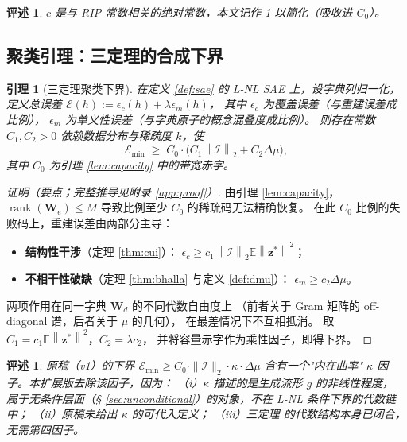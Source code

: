 \documentclass[11pt,a4paper]{article}
\newtheorem{lemma}[theorem]{引理}
\newtheorem{remark}[theorem]{评述}
\theoremstyle{remark}
\DeclareMathOperator{\rank}{rank}
\newcommand{\Z}{\bm{z}}
\newcommand{\W}{\bm{W}}
\newcommand{\I}{\mathcal{I}}
\newcommand{\Err}{\mathcal{E}}
\newcommand{\norm}[1]{\left\lVert#1\right\rVert}
\begin{document}
\begin{remark}
$c$ 是与 RIP 常数相关的绝对常数，本文记作 1 以简化（吸收进 $C_0$）。
\end{remark}

\subsection{聚类引理：三定理的合成下界}

\begin{lemma}[三定理聚类下界]\label{lem:cluster}
在定义 \ref{def:sae} 的 L-NL SAE 上，设字典列归一化，定义总误差
$\Err(h) := \epsilon_c(h) + \lambda \epsilon_m(h)$，
其中 $\epsilon_c$ 为覆盖误差（与重建误差成比例），
$\epsilon_m$ 为单义性误差（与字典原子的概念混叠度成比例）。
则存在常数 $C_1, C_2 > 0$ 依赖数据分布与稀疏度 $k$，使
\[
\Err_{\min}
\;\geq\;
C_0 \cdot \big(C_1 \norm{\I}_2 + C_2 \Delta\mu\big),
\]
其中 $C_0$ 为引理 \ref{lem:capacity} 中的带宽赤字。
\end{lemma}

\begin{proof}[证明（要点；完整推导见附录 \ref{app:proof}）]
由引理 \ref{lem:capacity}，$\rank(\W_e) \leq M$ 导致比例至少 $C_0$ 的稀疏码无法精确恢复。
在此 $C_0$ 比例的失败码上，重建误差由两部分主导：
\begin{itemize}[leftmargin=*,itemsep=2pt]
\item \textbf{结构性干涉}（定理 \ref{thm:cui}）：
$\epsilon_c \geq c_1 \norm{\I}_2 \mathbb{E}\norm{\Z^\ast}^2$；
\item \textbf{不相干性破缺}（定理 \ref{thm:bhalla} 与定义 \ref{def:dmu}）：
$\epsilon_m \geq c_2 \Delta\mu$。
\end{itemize}
两项作用在同一字典 $\W_d$ 的不同代数自由度上
（前者关于 Gram 矩阵的 off-diagonal 谱，后者关于 $\mu$ 的几何），
在最差情况下不互相抵消。
取 $C_1 = c_1 \mathbb{E}\norm{\Z^\ast}^2$，$C_2 = \lambda c_2$，
并将容量赤字作为乘性因子，即得下界。
\end{proof}

\begin{remark}\label{rem:no-curvature}
原稿（v1）的下界 $\Err_{\min} \geq C_0 \cdot \|\I\|_2 \cdot \kappa \cdot \Delta\mu$
含有一个"内在曲率" $\kappa$ 因子。本扩展版去除该因子，因为：
（i）$\kappa$ 描述的是生成流形 $g$ 的非线性程度，
属于无条件层面（§ \ref{sec:unconditional}）的对象，不在 L-NL 条件下界的代数链中；
（ii）原稿未给出 $\kappa$ 的可代入定义；
（iii）三定理 \cite{oneill2024,cui2026,bhalla2026} 的代数结构本身已闭合，
无需第四因子。
\end{remark}
\end{document}
